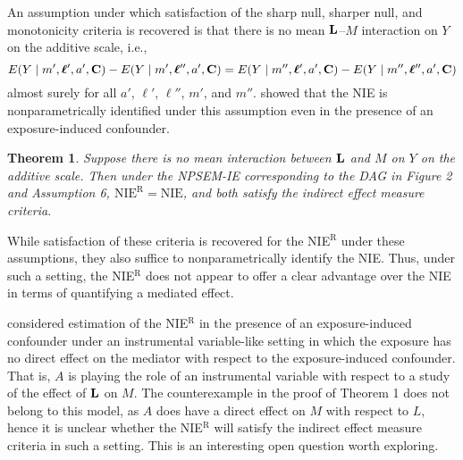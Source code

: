 \documentclass[12pt]{article}
\newtheorem{theorem}{Theorem}
\begin{document}
An assumption under which satisfaction of the sharp null, sharper null, and monotonicity criteria is recovered is that there is no mean ${\bf L}$--$M$ interaction on $Y$ on the additive scale, i.e., 
\[E(Y\mid m', {\boldsymbol \ell'}, a', {\bf C}) - E(Y\mid m', {\boldsymbol \ell''}, a', {\bf C}) = E(Y\mid m'', {\boldsymbol \ell'}, a', {\bf C}) - E(Y\mid m'', {\boldsymbol \ell''}, a', {\bf C})\]
almost surely for all $a'$, ${\boldsymbol \ell'}$, ${\boldsymbol \ell''}$, $m'$, and $m''$. \cite{tchetgen2014identification} showed that the NIE is nonparametrically identified under this assumption even in the presence of an exposure-induced confounder.
\begin{theorem}
    \label{thm:no-LM-interaction}
    Suppose there is no mean interaction between ${\bf L}$ and $M$ on $Y$ on the additive scale. Then under the NPSEM-IE corresponding to the DAG in Figure 2 and Assumption 6, $\text{NIE}^{\mathrm{R}}=\text{NIE}$, and both satisfy the indirect effect measure criteria.
\end{theorem}

While satisfaction of these criteria is recovered for the NIE$^{\text{R}}$ under these assumptions, they also suffice to nonparametrically identify the NIE. Thus, under such a setting, the NIE$^{\text{R}}$ does not appear to offer a clear advantage over the NIE in terms of quantifying a mediated effect.

\cite{rudolph2018robust} considered estimation of the NIE$^{\text{R}}$ in the presence of an exposure-induced confounder under an instrumental variable-like setting in which the exposure has no direct effect on the mediator with respect to the exposure-induced confounder. That is, $A$ is playing the role of an instrumental variable with respect to a study of the effect of $\bf L$ on $M$. The counterexample in the proof of Theorem 1 does not belong to this model, as $A$ does have a direct effect on $M$ with respect to $L$, hence it is unclear whether the NIE$^{\text{R}}$ will satisfy the indirect effect measure criteria in such a setting. This is an interesting open question worth exploring.
\end{document}
